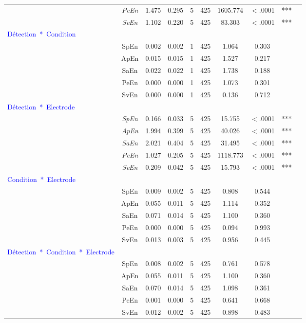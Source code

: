 \begin{table}[!t]
\begin{tabular}{|l|*{9}{c|}}
& \textit{PeEn} & 1.475 & 0.295 & 5 & 425 & 1605.774 & $<$.0001 & *** \\ 
& \textit{SvEn} & 1.102 & 0.220 & 5 & 425 & 83.303 & $<$.0001 & *** \\ 
\hline
\textcolor{blue}{Détection~*~Condition} & & & & & & & & \\ 
\hline
& SpEn & 0.002 & 0.002 & 1 & 425 & 1.064 & 0.303 & \\ 
& ApEn & 0.015 & 0.015 & 1 & 425 & 1.527 & 0.217 & \\ 
& SaEn & 0.022 & 0.022 & 1 & 425 & 1.738 & 0.188 & \\ 
& PeEn & 0.000 & 0.000 & 1 & 425 & 1.073 & 0.301 & \\ 
& SvEn & 0.000 & 0.000 & 1 & 425 & 0.136 & 0.712 & \\ 
\hline
\textcolor{blue}{Détection~*~Electrode} & & & & & & & & \\ 
\hline
& \textit{SpEn} & 0.166 & 0.033 & 5 & 425 & 15.755 & $<$.0001 & *** \\ 
& \textit{ApEn} & 1.994 & 0.399 & 5 & 425 & 40.026 & $<$.0001 & *** \\ 
& \textit{SaEn} & 2.021 & 0.404 & 5 & 425 & 31.495 & $<$.0001 & *** \\ 
& \textit{PeEn} & 1.027 & 0.205 & 5 & 425 & 1118.773 & $<$.0001 & *** \\ 
& \textit{SvEn} & 0.209 & 0.042 & 5 & 425 & 15.793 & $<$.0001 & *** \\ 
\hline
\textcolor{blue}{Condition~*~Electrode} & & & & & & & & \\ 
\hline
& SpEn & 0.009 & 0.002 & 5 & 425 & 0.808 & 0.544 & \\ 
& ApEn & 0.055 & 0.011 & 5 & 425 & 1.114 & 0.352 & \\ 
& SaEn & 0.071 & 0.014 & 5 & 425 & 1.100 & 0.360 & \\ 
& PeEn & 0.000 & 0.000 & 5 & 425 & 0.094 & 0.993 & \\ 
& SvEn & 0.013 & 0.003 & 5 & 425 & 0.956 & 0.445 & \\ 
\hline
\textcolor{blue}{Détection~*~Condition~*~Electrode} & & & & & & & & \\ 
\hline
& SpEn & 0.008 & 0.002 & 5 & 425 & 0.761 & 0.578 & \\ 
& ApEn & 0.055 & 0.011 & 5 & 425 & 1.100 & 0.360 & \\ 
& SaEn & 0.070 & 0.014 & 5 & 425 & 1.098 & 0.361 & \\ 
& PeEn & 0.001 & 0.000 & 5 & 425 & 0.641 & 0.668 & \\ 
& SvEn & 0.012 & 0.002 & 5 & 425 & 0.898 & 0.483 & \\ 
\hline
\end{tabular}

\end{table}

